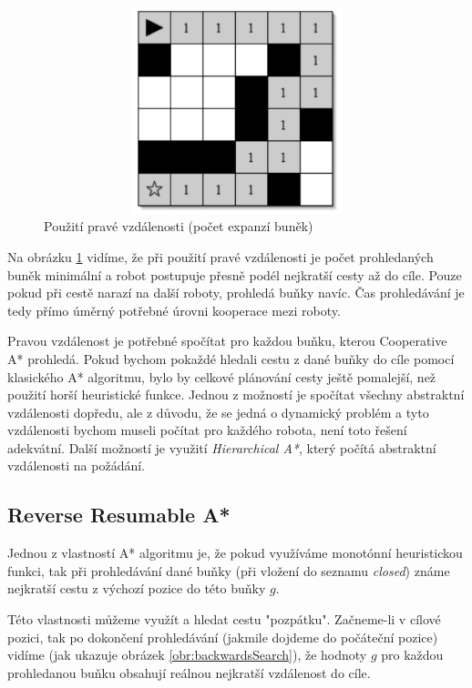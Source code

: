 \begin{figure}[htb]
	\begin{center}
		\includegraphics*[width=15cm,height=6cm,keepaspectratio]{obr/hierarchCoopMetric}
	\end{center}
	\caption[caption]{Použití pravé vzdálenosti (počet expanzí buněk) \cite{Silver2006}}
	\label{obr:hierarchCoopMetric}
\end{figure}

Na obrázku \ref{obr:hierarchCoopMetric} vidíme, že při použití pravé vzdálenosti je počet prohledaných buněk minimální a robot postupuje přesně podél nejkratší cesty až do cíle. Pouze pokud při cestě narazí na další roboty, prohledá buňky navíc. Čas prohledávání je tedy přímo úměrný potřebné úrovni kooperace mezi roboty.

Pravou vzdálenost je potřebné spočítat pro každou buňku, kterou Cooperative A* prohledá. Pokud bychom pokaždé hledali cestu z dané buňky do cíle pomocí klasického A* algoritmu, bylo by celkové plánování cesty ještě pomalejší, než použití horší heuristické funkce. Jednou z možností je spočítat všechny abstraktní vzdálenosti dopředu, ale z důvodu, že se jedná o dynamický problém a tyto vzdálenosti bychom museli počítat pro každého robota, není toto řešení adekvátní. Další možností je využití \emph{Hierarchical A*}, který počítá abstraktní vzdálenosti na požádání.

\subsection{Reverse Resumable A*}
Jednou z vlastností A* algoritmu je, že pokud využíváme monotónní heuristickou funkci, tak při prohledávání dané buňky (při vložení do seznamu \emph{closed}) známe nejkratší cestu z výchozí pozice do této buňky $g$.

Této vlastnosti můžeme využít a hledat cestu "pozpátku". Začneme-li v cílové pozici, tak po dokončení prohledávání (jakmile dojdeme do počáteční pozice) vidíme (jak ukazuje obrázek \ref{obr:backwardsSearch}), že hodnoty $g$ pro každou prohledanou buňku obsahují reálnou nejkratší vzdálenost do cíle.

